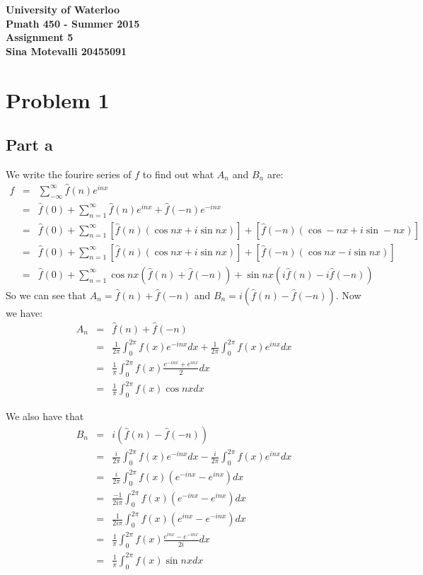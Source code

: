 \documentclass[12pt]{article}
\begin{document}
\begin{center}
  {\Large\bf University of Waterloo}\\
  \vspace{3mm}
         {\Large\bf Pmath 450 - Summer 2015}\\
         \vspace{2mm}
                {\Large\bf Assignment 5}\\
                \vspace{3mm}
                \textbf{Sina Motevalli 20455091}
\end{center}
\section*{Problem 1}
\subsection*{Part a}
We write the fourire series of $f$ to find out what $A_n$ and $B_n$ are:
\begin{eqnarray*}
f &=& \sum_{-\infty}^{\infty} \hat{f}(n)e^{inx} \\ &=&
\hat{f}(0)+\sum_{n=1}^{\infty} \hat{f}(n)e^{inx}+\hat{f}(-n)e^{-inx}
\\ &=&
\hat{f}(0)+\sum_{n=1}^{\infty}
[\hat{f}(n)(\cos nx+i\sin nx)]+[\hat{f}(-n)(\cos -nx+i\sin -nx)]
\\ &=&
\hat{f}(0)+\sum_{n=1}^{\infty}
[\hat{f}(n)(\cos nx+i\sin nx)]+[\hat{f}(-n)(\cos nx-i\sin nx)]
\\ &=&
\hat{f}(0)+\sum_{n=1}^{\infty} \cos nx (\hat{f}(n)+\hat{f}(-n))+\sin nx (i\hat{f}(n)-i\hat{f}(-n))
\end{eqnarray*}
So we can see that
$A_n= \hat{f}(n)+\hat{f}(-n)$ and $B_n=i(\hat{f}(n)-\hat{f}(-n))$. Now we have:
\begin{eqnarray*}
A_n &=& \hat{f}(n)+\hat{f}(-n) \\ &=&
\frac{1}{2\pi}\int_0^{2\pi} f(x)e^{-inx}dx +\frac{1}{2\pi}\int_0^{2\pi} f(x)e^{inx}dx
\\ &=&
\frac{1}{\pi}\int_0^{2\pi} f(x) \frac{e^{-inx}+e^{inx}}{2}dx
\\ &=&
\frac{1}{\pi}\int_0^{2\pi} f(x) \cos nxdx
\end{eqnarray*}

\clearpage
We also have that
\begin{eqnarray*}
B_n &=& i(\hat{f}(n)-\hat{f}(-n)) \\&=&
\frac{i}{2\pi}\int_0^{2\pi} f(x)e^{-inx}dx -\frac{i}{2\pi}\int_0^{2\pi} f(x)e^{inx}dx
\\ &=&
\frac{i}{2\pi}\int_0^{2\pi} f(x) (e^{-inx}-e^{inx})dx
\\ &=&
\frac{-1}{2i\pi}\int_0^{2\pi} f(x) (e^{-inx}-e^{inx})dx \\ &=&
\frac{1}{2i\pi}\int_0^{2\pi} f(x) (e^{inx}-e^{-inx})dx \\ &=&
\frac{1}{\pi}\int_0^{2\pi} f(x) \frac{e^{inx}-e^{-inx}}{2i}dx \\ &=&
\frac{1}{\pi}\int_0^{2\pi} f(x) \sin nx dx
\end{eqnarray*}
\end{document}
